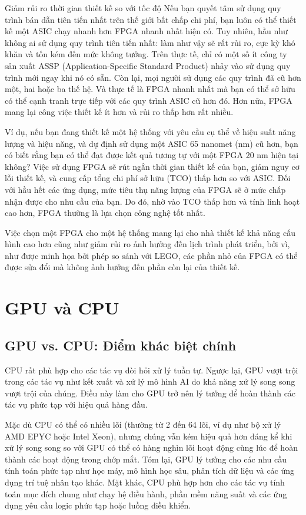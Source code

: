 \documentclass[a4paper]{article}
\begin{document}
Giảm rủi ro thời gian thiết kế so với tốc độ
Nếu bạn quyết tâm sử dụng quy trình bán dẫn tiên tiến nhất trên thế giới bất chấp chi phí, bạn luôn có thể thiết kế một ASIC chạy nhanh hơn FPGA nhanh nhất hiện có. Tuy nhiên, hầu như không ai sử dụng quy trình tiên tiến nhất: làm như vậy sẽ rất rủi ro, cực kỳ khó khăn và tốn kém đến mức không tưởng. Trên thực tế, chỉ có một số ít công ty sản xuất ASSP (Application-Specific Standard Product) nhảy vào sử dụng quy trình mới ngay khi nó có sẵn. Còn lại, mọi người sử dụng các quy trình đã cũ hơn một, hai hoặc ba thế hệ. Và thực tế là FPGA nhanh nhất mà bạn có thể sở hữu có thể cạnh tranh trực tiếp với các quy trình ASIC cũ hơn đó. Hơn nữa, FPGA mang lại công việc thiết kế ít hơn và rủi ro thấp hơn rất nhiều.

Ví dụ, nếu bạn đang thiết kế một hệ thống với yêu cầu cụ thể về hiệu suất năng lượng và hiệu năng, và dự định sử dụng một ASIC 65 nanomet (nm) cũ hơn, bạn có biết rằng bạn có thể đạt được kết quả tương tự với một FPGA 20 nm hiện tại không? Việc sử dụng FPGA sẽ rút ngắn thời gian thiết kế của bạn, giảm nguy cơ lỗi thiết kế, và cung cấp tổng chi phí sở hữu (TCO) thấp hơn so với ASIC. Đối với hầu hết các ứng dụng, mức tiêu thụ năng lượng của FPGA sẽ ở mức chấp nhận được cho nhu cầu của bạn. Do đó, nhờ vào TCO thấp hơn và tính linh hoạt cao hơn, FPGA thường là lựa chọn công nghệ tốt nhất.

Việc chọn một FPGA cho một hệ thống mang lại cho nhà thiết kế khả năng cấu hình cao hơn cũng như giảm rủi ro ảnh hưởng đến lịch trình phát triển, bởi vì, như được minh họa bởi phép so sánh với LEGO, các phần nhỏ của FPGA có thể được sửa đổi mà không ảnh hưởng đến phần còn lại của thiết kế.

\section{GPU và CPU}

\subsection{GPU vs. CPU: Điểm khác biệt chính}

CPU rất phù hợp cho các tác vụ đòi hỏi xử lý tuần tự. Ngược lại, GPU vượt trội trong các tác vụ như kết xuất và xử lý mô hình AI do khả năng xử lý song song vượt trội của chúng. Điều này làm cho GPU trở nên lý tưởng để hoàn thành các tác vụ phức tạp với hiệu quả hàng đầu.

Mặc dù CPU có thể có nhiều lõi (thường từ 2 đến 64 lõi, ví dụ như bộ xử lý AMD EPYC hoặc Intel Xeon), nhưng chúng vẫn kém hiệu quả hơn đáng kể khi xử lý song song so với GPU có thể có hàng nghìn lõi hoạt động cùng lúc để hoàn thành các hoạt động trong chớp mắt.
Tóm lại, GPU lý tưởng cho các nhu cầu tính toán phức tạp như học máy, mô hình học sâu, phân tích dữ liệu và các ứng dụng trí tuệ nhân tạo khác. Mặt khác, CPU phù hợp hơn cho các tác vụ tính toán mục đích chung như chạy hệ điều hành, phần mềm năng suất và các ứng dụng yêu cầu logic phức tạp hoặc luồng điều khiển.
\end{document}
